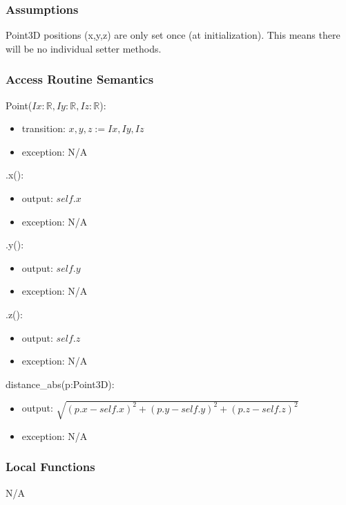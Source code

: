 \documentclass[12pt, titlepage]{article}
\begin{document}
\subsubsection{Assumptions}
Point3D positions (x,y,z) are only set once (at initialization). This means 
there will be no individual setter methods.

\subsubsection{Access Routine Semantics}
\noindent Point($Ix: \mathbb{R}, Iy: \mathbb{R}, Iz: \mathbb{R}$):
\begin{itemize}
	\item transition: $x, y, z := Ix, Iy, Iz$
	\item exception: N/A
\end{itemize}

\noindent .x():
\begin{itemize}
	\item output: $self.x$
	\item exception: N/A
\end{itemize}

\noindent .y():
\begin{itemize}
	\item output: $self.y$
	\item exception: N/A
\end{itemize}

\noindent .z():
\begin{itemize}
	\item output: $self.z$
	\item exception: N/A
\end{itemize} 

\noindent distance\_abs(p:Point3D):
\begin{itemize}
	\item output: $ \sqrt{(p.x-self.x)^2 + (p.y-self.y)^2 + (p.z-self.z)^2}$
	\item exception: N/A
\end{itemize} 

\subsubsection{Local Functions}
N/A
\end{document}
